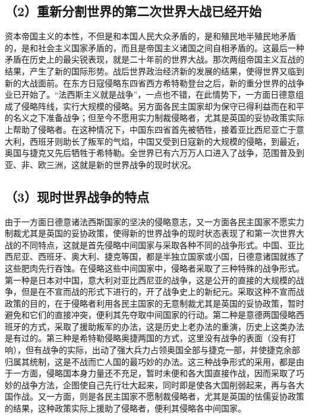 \subsection{（2）重新分割世界的第二次世界大战已经开始}

资本帝国主义的本性，不但是和本国人民大众矛盾的，是和殖民地半殖民地矛盾的，是和社会主义国家矛盾的，而且是帝国主义诸国之间自相矛盾的。这最后一种矛盾在历史上的最尖锐表现，就是二十年前的世界大战。那次两组帝国主义互战的结果，产生了新的国际形势。战后世界政治经济新的发展的结果，使得世界又临到新的大战面前。在东方日寇侵略东四省西方希特勒登台之后，新的重分世界的战争业已开始了。“法西斯主义就是战争”，一点也不错，在此情势下，一方面日德意组成了侵略阵线，实行大规模的侵略。另方面各民主国家却为保守已得利益而在和平的名义之下准备战争；但至今不愿用实力制裁侵略者，尤其是英国的妥协政策实际上帮助了侵略者。在这种情况下，中国东四省首先被牺牲，接着亚比西尼亚亡于意大利，西班牙则助长了叛军的气焰，中国又受到日寇新的大规模的侵略，到最近，奥国与捷克又先后牺牲于希特勒。全世界已有六万万人口进入了战争，范围普及到亚、非、欧三洲，这就是新的世界战争的现时状况。

\subsection{（3）现时世界战争的特点}

由于一方面日德意诸法西斯国家的坚决的侵略意志，又一方面各民主国家不愿实力制裁尤其是英国的妥协政策，使得新的世界战争的现时状态表现了和第一次世界大战的不同特点，这就是首先侵略中间国家与采取各种不同的战争形式。中国、亚比西尼亚、西班牙、奥大利、捷克等国，都是半独立国家或小国，日德意诸国就拣了这些肥肉先行吞蚀。在侵略这些中间国家中，侵略者采取了三种特殊的战争形式。第一种是日本对中国，意大利对亚比西尼亚的战争，这是公开的直接的大规模的战争，但是在不宣而战的形式下进行的，开了战争史上的新纪元。采取这种不宣而战政策的目的，在于侵略者利用各民主国家的无意制裁尤其是英国的妥协政策，暂时避免和它们的直接冲突，便利其先夺取中间国家的行动。第二种是意德两国侵略西班牙的方式，采取了援助叛军的办法，这是历史上老办法的重演，历史上这类办法是有过的。第三种是希特勒侵略奥捷两国的方式，这里没有战争的表面（没有打响），但有战争的实际，出动了强大兵力占领奥国全部与捷克一部，并使捷克余部归属其统制，这是不战而亡人国的最巧妙的办法。这三种战争形式的采用，都是由于一方面，侵略国本身力量还不充足，暂时未便和各大国直接作战，因而采取了巧妙的战争方法，企图使自己先行壮大起来，同时即是使各大国削弱起来，再与各大国作战。又一方面，则是各民主国家不愿制裁侵略者，尤其是英国的怯儒妥协政策的结果，这种政策实际上援助了侵略者，便利其侵略各中间国家。

